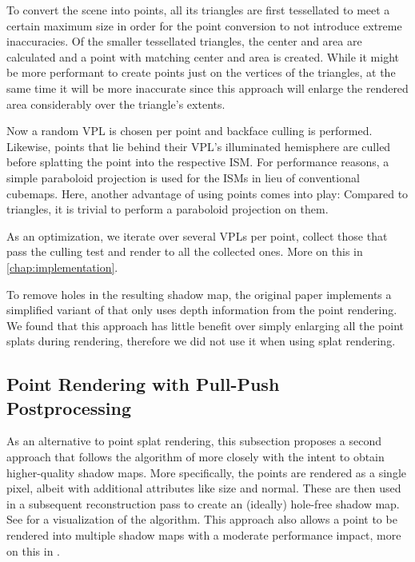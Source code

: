 To convert the scene into points, all its triangles are first tessellated to meet a certain maximum size in order for the point conversion to not introduce extreme inaccuracies. Of the smaller tessellated triangles, the center and area are calculated and a point with matching center and area is created. While it might be more performant to create points just on the vertices of the triangles, at the same time it will be more inaccurate since this approach will enlarge the rendered area considerably over the triangle's extents.

Now a random VPL is chosen per point and backface culling is performed. Likewise, points that lie behind their VPL's illuminated hemisphere are culled before splatting the point into the respective ISM. For performance reasons, a simple paraboloid projection is used for the ISMs in lieu of conventional cubemaps. Here, another advantage of using points comes into play: Compared to triangles, it is trivial to perform a paraboloid projection on them.

As an optimization, we iterate over several VPLs per point, collect those that pass the culling test and render to all the collected ones. More on this in \cref{chap:implementation}.

To remove holes in the resulting shadow map, the original paper implements a simplified variant of \citet{Marroquim:2007:reconstruction} that only uses depth information from the point rendering. We found that this approach has little benefit over simply enlarging all the point splats during rendering, therefore we did not use it when using splat rendering.



\subsection{Point Rendering with Pull-Push Postprocessing}

As an alternative to point splat rendering, this subsection proposes a second approach that follows the algorithm of \citet{Marroquim:2007:reconstruction} more closely with the intent to obtain higher-quality shadow maps. More specifically, the points are rendered as a single pixel, albeit with additional attributes like size and normal. These are then used in a subsequent reconstruction pass to create an (ideally) hole-free shadow map. See  for a visualization of the algorithm. This approach also allows a point to be rendered into multiple shadow maps with a moderate performance impact, more on this in .


